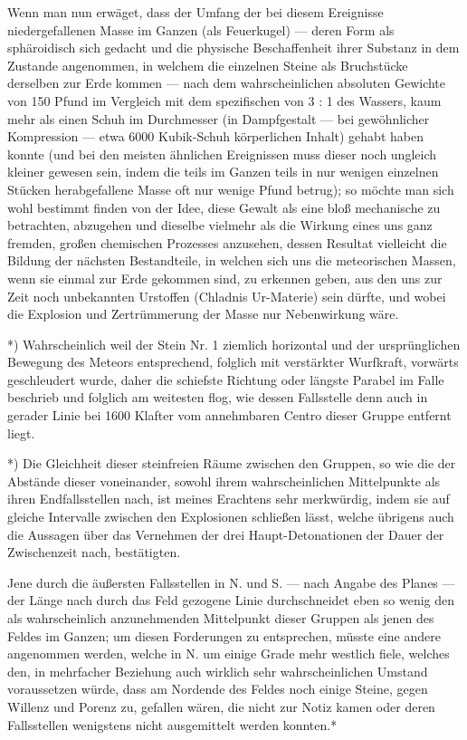 \documentclass[a4paper, 11pt, oneside, german]{article}
\begin{document}
Wenn man nun erwäget, dass der Umfang der bei diesem Ereignisse niedergefallenen Masse im Ganzen (als Feuerkugel) --- deren Form als sphäroidisch sich gedacht und die physische Beschaffenheit ihrer Substanz in dem Zustande angenommen, in welchem die einzelnen Steine als Bruchstücke derselben zur Erde kommen --- nach dem wahrscheinlichen absoluten Gewichte von 150 Pfund im Vergleich mit dem spezifischen von 3 : 1 des Wassers, kaum mehr als einen Schuh im Durchmesser (in Dampfgestalt --- bei gewöhnlicher Kompression --- etwa 6000 Kubik-Schuh körperlichen Inhalt) gehabt haben konnte (und bei den meisten ähnlichen Ereignissen muss dieser noch ungleich kleiner gewesen sein, indem die teils im Ganzen teils in nur wenigen einzelnen Stücken herabgefallene Masse oft nur wenige Pfund betrug); so möchte man sich wohl bestimmt finden von der Idee, diese Gewalt als eine bloß mechanische zu betrachten, abzugehen und dieselbe vielmehr als die Wirkung eines uns ganz fremden, großen chemischen Prozesses anzusehen, dessen Resultat vielleicht die Bildung der nächsten Bestandteile, in welchen sich uns die meteorischen Massen, wenn sie einmal zur Erde gekommen sind, zu erkennen geben, aus den uns zur Zeit noch unbekannten Urstoffen (Chladnis Ur-Materie) sein dürfte, und wobei die Explosion und Zertrümmerung der Masse nur Nebenwirkung wäre.

*) Wahrscheinlich weil der Stein Nr. 1 ziemlich horizontal und der ursprünglichen Bewegung des Meteors entsprechend, folglich mit verstärkter Wurfkraft, vorwärts geschleudert wurde, daher die schiefste Richtung oder längste Parabel im Falle beschrieb und folglich am weitesten flog, wie dessen Fallsstelle denn auch in gerader Linie bei 1600 Klafter vom annehmbaren Centro dieser Gruppe entfernt liegt.

*) Die Gleichheit dieser steinfreien Räume zwischen den Gruppen, so wie die der Abstände dieser voneinander, sowohl ihrem wahrscheinlichen Mittelpunkte als ihren Endfallsstellen nach, ist meines Erachtens sehr merkwürdig, indem sie auf gleiche Intervalle zwischen den Explosionen schließen lässt, welche übrigens auch die Aussagen über das Vernehmen der drei Haupt-Detonationen der Dauer der Zwischenzeit nach, bestätigten.

Jene durch die äußersten Fallsstellen in N. und S. --- nach Angabe des Planes --- der Länge nach durch das Feld gezogene Linie durchschneidet eben so wenig den als wahrscheinlich anzunehmenden Mittelpunkt dieser Gruppen als jenen des Feldes im Ganzen; um diesen Forderungen zu entsprechen, müsste eine andere angenommen werden, welche in N. um einige Grade mehr westlich fiele, welches den, in mehrfacher Beziehung auch wirklich sehr wahrscheinlichen Umstand voraussetzen würde, dass am Nordende des Feldes noch einige Steine, gegen Willenz und Porenz zu, gefallen wären, die nicht zur Notiz kamen oder deren Fallsstellen wenigstens nicht ausgemittelt werden konnten.*
\end{document}

